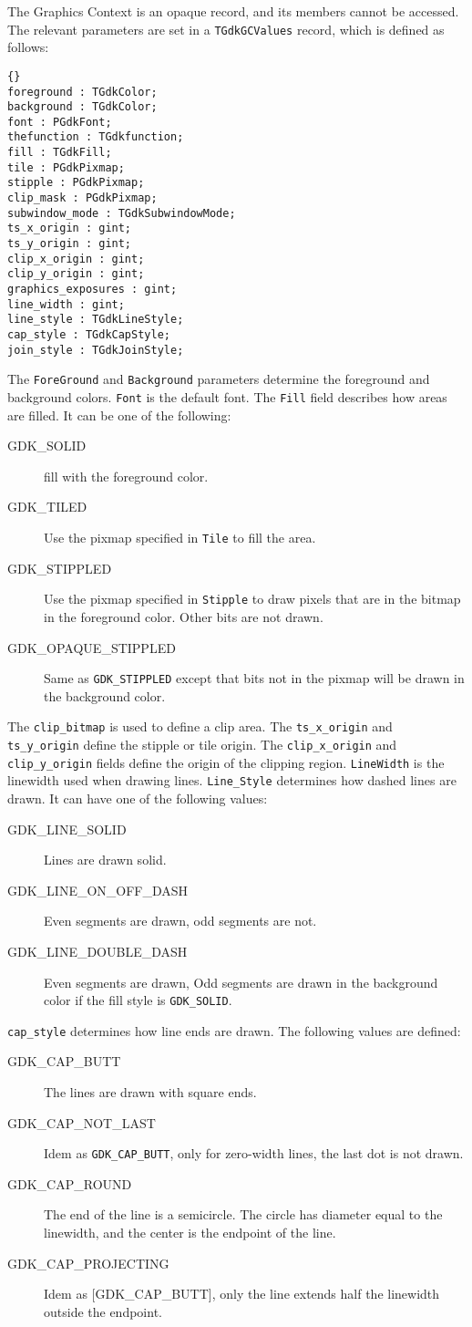 \documentclass[10pt]{article}
\newcommand{\var}[1]{\texttt{#1}}
\begin{document}
The Graphics Context is an opaque record, and its members cannot be
accessed. The relevant parameters are set in a \var{TGdkGCValues} record,
which is defined as follows:
\begin{lstlisting}{}
foreground : TGdkColor;
background : TGdkColor;
font : PGdkFont;
thefunction : TGdkfunction;
fill : TGdkFill;
tile : PGdkPixmap;
stipple : PGdkPixmap;
clip_mask : PGdkPixmap;
subwindow_mode : TGdkSubwindowMode;
ts_x_origin : gint;
ts_y_origin : gint;
clip_x_origin : gint;
clip_y_origin : gint;
graphics_exposures : gint;
line_width : gint;
line_style : TGdkLineStyle;
cap_style : TGdkCapStyle;
join_style : TGdkJoinStyle;
\end{lstlisting}{}
The \var{ForeGround} and \var{Background} parameters determine the foreground
and background colors. \var{Font} is the default font. The \var{Fill} field
describes how areas are filled. It can be one of the following:
\begin{description}
\item[GDK\_SOLID] fill with the foreground color.
\item[GDK\_TILED] Use the pixmap specified in \var{Tile} to fill the area.
\item[GDK\_STIPPLED] Use the pixmap specified in \var{Stipple} to draw
pixels that are in the bitmap in the foreground color. Other bits are not
drawn.
\item[GDK\_OPAQUE\_STIPPLED] Same as \var{GDK\_STIPPLED} except that bits 
not in the pixmap will be drawn in the background color.
\end{description}
The \var{clip\_bitmap} is used to define a clip area. The
\var{ts\_x\_origin} and \var{ts\_y\_origin} define the stipple or tile
origin.  The \var{clip\_x\_origin} and \var{clip\_y\_origin} fields define 
the origin of the clipping region.
\var{LineWidth} is the linewidth used when drawing lines. \var{Line\_Style}
determines how dashed lines are drawn. It can have one of the following
values:
\begin{description}
\item[GDK\_LINE\_SOLID] Lines are drawn solid.
\item[GDK\_LINE\_ON\_OFF\_DASH] Even segments are drawn, odd segments are
not.
\item[GDK\_LINE\_DOUBLE\_DASH] Even segments are drawn, Odd segments are
drawn in the background color if the fill style is \var{GDK\_SOLID}.
\end{description}
\var{cap\_style} determines how line ends are drawn. The following values are
defined:
\begin{description}
\item[GDK\_CAP\_BUTT] The lines are drawn with square ends.  
\item[GDK\_CAP\_NOT\_LAST] Idem as \var{GDK\_CAP\_BUTT}, only for zero-width
lines, the last dot is not drawn.
\item[GDK\_CAP\_ROUND] The end of the line is a semicircle. The circle has
diameter equal to the linewidth, and the center is the endpoint of the line.
\item[GDK\_CAP\_PROJECTING] Idem as [GDK\_CAP\_BUTT], only the line extends
half the linewidth outside the endpoint.
\end{description}
\end{document}
